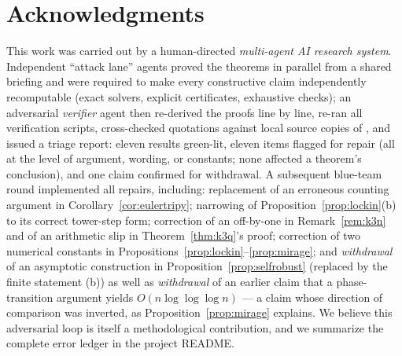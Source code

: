 \documentclass[a4paper,11pt]{amsart}
\theoremstyle{definition}
\theoremstyle{remark}
\begin{document}
\section*{Acknowledgments}
This work was carried out by a human-directed \emph{multi-agent AI research system}. Independent ``attack
lane'' agents proved the theorems in parallel from a shared briefing and were required to make every
constructive claim independently recomputable (exact solvers, explicit certificates, exhaustive checks);
an adversarial \emph{verifier} agent then re-derived the proofs line by line, re-ran all verification
scripts, cross-checked quotations against local source copies of \cite{BM22,AABC25,CKLOT20,CFS14}, and
issued a triage report: eleven results green-lit, eleven items flagged for repair (all at the level of
argument, wording, or constants; none affected a theorem's conclusion), and one claim confirmed for
withdrawal. A subsequent blue-team round implemented all repairs, including: replacement of an erroneous
counting argument in Corollary~\ref{cor:eulertripy}; narrowing of Proposition~\ref{prop:lockin}(b) to its
correct tower-step form; correction of an off-by-one in Remark~\ref{rem:k3n} and of an arithmetic slip in
Theorem~\ref{thm:k3q}'s proof; correction of two numerical constants in
Propositions~\ref{prop:lockin}--\ref{prop:mirage}; and \emph{withdrawal} of an asymptotic construction in
Proposition~\ref{prop:selfrobust} (replaced by the finite statement (b)) as well as \emph{withdrawal} of an
earlier claim that a phase-transition argument yields $O(n\log\log\log n)$ --- a claim whose direction of
comparison was inverted, as Proposition~\ref{prop:mirage} explains. We believe this adversarial loop is
itself a methodological contribution, and we summarize the complete error ledger in the project README.
\end{document}
